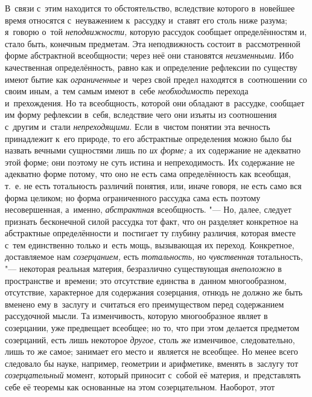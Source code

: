 В~связи с~этим находится то обстоятельство, вследствие которого в~новейшее
время относятся с~неуважением к~рассудку и~ставят его столь ниже
разума; я~говорю о~той {\em неподвижности,} которую
рассудок сообщает определённостям и, стало быть, конечным предметам. Эта
неподвижность состоит в~рассмотренной форме абстрактной всеобщности; через неё
они становятся {\em неизменными}. Ибо качественная определённость, равно как и
определение рефлексии по существу имеют бытие как {\em ограниченные} и~через
свой предел находятся в~соотношении со своим иным, а~тем самым имеют в~себе
{\em необходимость} перехода и~прехождения. Но та всеобщность, которой они
обладают в~рассудке, сообщает им форму рефлексии в~себя, вследствие чего они
изъяты из соотношения с~другим и~стали {\em непреходящими}. Если в~чистом
понятии эта вечность принадлежит к~его природе, то его абстрактные определения
можно было бы назвать вечными сущностями лишь по {\em их форме;} а~их
содержание не адекватно этой форме; они поэтому не суть истина и
непреходимость. Их содержание не адекватно форме потому, что оно не есть сама
определённость как всеобщая, т.~е. не есть тотальность различий понятия, или,
иначе говоря, не есть само вся форма целиком; но форма ограниченного рассудка
сама есть поэтому несовершенная, а~именно, {\em абстрактная}
всеобщность. "--- Но, далее, следует признать
бесконечной силой рассудка тот факт, что он разделяет конкретное на
абстрактные определённости и~постигает ту глубину различия, которая вместе
с~тем единственно только и~есть мощь, вызывающая их переход. Конкретное,
доставляемое нам {\em созерцанием,} есть {\em тотальность,} но
{\em чувственная} тотальность, "--- некоторая реальная материя,
безразлично существующая {\em внеположно} в
пространстве и~времени; это отсутствие единства в~данном многообразном,
отсутствие, характерное для содержания созерцания, отнюдь не должно же быть
вменено ему в~заслугу и~считаться его преимуществом перед содержанием
рассудочной мысли. Та изменчивость, которую многообразное являет в
созерцании, уже предвещает всеобщее; но то, что при этом делается предметом
созерцаний, есть лишь некоторое
{\em другое,} столь же
изменчивое, следовательно, лишь то же самое; занимает его место и~является
не всеобщее. Но менее всего следовало бы науке, например, геометрии и
арифметике, вменять в~заслугу тот
{\em созерцательный}
момент, который приносит с~собой её материя, и~представлять
себе её теоремы как основанные на этом созерцательном. Наоборот, этот

